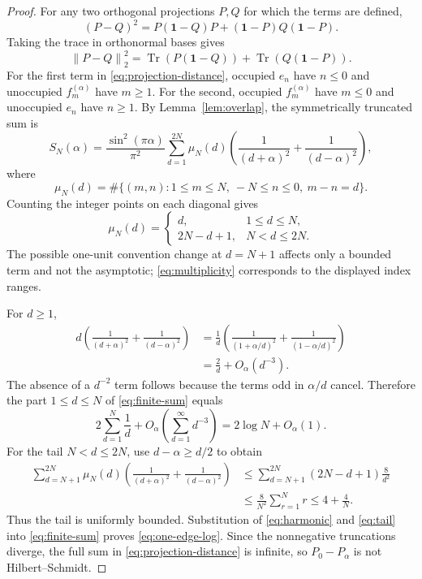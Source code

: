 \documentclass[11pt]{article}
\theoremstyle{remark}
\newcommand{\Tr}{\operatorname{Tr}}
\newcommand{\id}{\mathbf 1}
\newcommand{\norm}[1]{\left\lVert #1\right\rVert}
\begin{document}
\begin{proof}
For any two orthogonal projections $P,Q$ for which the terms are
defined,
\[
 (P-Q)^2=P(\id-Q)P+(\id-P)Q(\id-P).
\]
Taking the trace in orthonormal bases gives
\[
 \norm{P-Q}_2^2
 =\Tr(P(\id-Q))+\Tr(Q(\id-P)).
\tag{5.3}\label{eq:projection-distance}
\]
For the first term in \eqref{eq:projection-distance}, occupied
$e_n$ have $n\le0$ and unoccupied $f_m^{(\alpha)}$ have $m\ge1$.
For the second, occupied $f_m^{(\alpha)}$ have $m\le0$ and
unoccupied $e_n$ have $n\ge1$.  By Lemma~\ref{lem:overlap}, the
symmetrically truncated sum is
\[
 S_N(\alpha)
 =\frac{\sin^2(\pi\alpha)}{\pi^2}
 \sum_{d=1}^{2N}\mu_N(d)
 \left(\frac1{(d+\alpha)^2}+\frac1{(d-\alpha)^2}\right),
\tag{5.4}\label{eq:finite-sum}
\]
where
\[
 \mu_N(d)=
 \#\{(m,n):1\le m\le N,\ -N\le n\le0,\ m-n=d\}.
\]
Counting the integer points on each diagonal gives
\[
 \mu_N(d)=
 \begin{cases}
 d,&1\le d\le N,\\
 2N-d+1,&N<d\le2N.
 \end{cases}
\tag{5.5}\label{eq:multiplicity}
\]
The possible one-unit convention change at $d=N+1$ affects only a
bounded term and not the asymptotic; \eqref{eq:multiplicity} corresponds
to the displayed index ranges.

For $d\ge1$,
\[
\begin{aligned}
d\left(\frac1{(d+\alpha)^2}+\frac1{(d-\alpha)^2}\right)
&=\frac1d\left(
\frac1{(1+\alpha/d)^2}
+\frac1{(1-\alpha/d)^2}\right)\\
&=\frac2d+O_\alpha(d^{-3}).
\end{aligned}
\tag{5.6}\label{eq:summand-expand}
\]
The absence of a $d^{-2}$ term follows because the terms odd in
$\alpha/d$ cancel.  Therefore the part $1\le d\le N$ of
\eqref{eq:finite-sum} equals
\[
 2\sum_{d=1}^N\frac1d+O_\alpha\left(\sum_{d=1}^\infty d^{-3}\right)
 =2\log N+O_\alpha(1).
\tag{5.7}\label{eq:harmonic}
\]
For the tail $N<d\le2N$, use $d-\alpha\ge d/2$ to obtain
\[
\begin{aligned}
\sum_{d=N+1}^{2N}\mu_N(d)
\left(\frac1{(d+\alpha)^2}+\frac1{(d-\alpha)^2}\right)
&\le
\sum_{d=N+1}^{2N}(2N-d+1)\frac8{d^2}\\
&\le \frac8{N^2}\sum_{r=1}^{N}r
\le 4+\frac4N.
\end{aligned}
\tag{5.8}\label{eq:tail}
\]
Thus the tail is uniformly bounded.  Substitution of
\eqref{eq:harmonic} and \eqref{eq:tail} into \eqref{eq:finite-sum}
proves \eqref{eq:one-edge-log}.  Since the nonnegative truncations
diverge, the full sum in \eqref{eq:projection-distance} is infinite,
so $P_0-P_\alpha$ is not Hilbert--Schmidt.
\end{proof}
\end{document}
